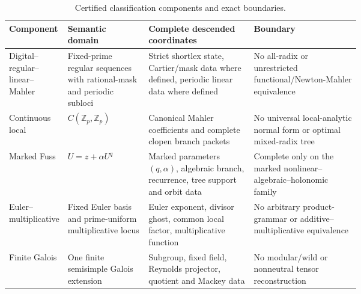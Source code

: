 \begin{landscape}
\begin{table}[htbp]
\centering
\scriptsize
\caption{Certified classification components and exact boundaries.}
\label{tab:block14-scope}
\begin{tabularx}{\linewidth}{@{}L{0.15\linewidth}L{0.23\linewidth}L{0.30\linewidth}Y@{}}
\toprule
Component & Semantic domain & Complete descended coordinates & Boundary \\
\midrule
Digital--regular--linear--Mahler & Fixed-prime regular sequences with rational-mask and periodic subloci & Strict shortlex state, Cartier/mask data where defined, periodic linear data where defined & No all-radix or unrestricted functional/Newton-Mahler equivalence \\
Continuous local & $C(\mathbb Z_p,\mathbb Z_p)$ & Canonical Mahler coefficients and complete clopen branch packets & No universal local-analytic normal form or optimal mixed-radix tree \\
Marked Fuss & $U=z+\alpha U^q$ & Marked parameters $(q,\alpha)$, algebraic branch, recurrence, tree support and orbit data & Complete only on the marked nonlinear--algebraic--holonomic family \\
Euler--multiplicative & Fixed Euler basis and prime-uniform multiplicative locus & Euler exponent, divisor ghost, common local factor, multiplicative function & No arbitrary product-grammar or additive--multiplicative equivalence \\
Finite Galois & One finite semisimple Galois extension & Subgroup, fixed field, Reynolds projector, quotient and Mackey data & No modular/wild or nonneutral tensor reconstruction \\
\bottomrule
\end{tabularx}
\end{table}
\end{landscape}
